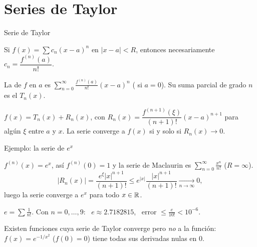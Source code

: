 \documentclass[10pt,aspectratio=169]{beamer}
\begin{document}
\section{Series de Taylor}

\begin{frame}{Serie de Taylor}
  \begin{teorema}
    Si $f(x)=\sum c_n(x-a)^n$ en $|x-a|<R$, entonces necesariamente $c_n=\dfrac{f^{(n)}(a)}{n!}$.
  \end{teorema}
  \begin{definicion}
    La  de $f$ en $a$ es $\displaystyle\sum_{n=0}^\infty\frac{f^{(n)}(a)}{n!}(x-a)^n$
    ( si $a=0$). Su suma parcial de grado $n$ es el  $T_n(x)$.
  \end{definicion}
  \begin{teorema}
    $f(x)=T_n(x)+R_n(x)$, con $R_n(x)=\dfrac{f^{(n+1)}(\xi)}{(n+1)!}(x-a)^{n+1}$ para algún $\xi$ entre $a$ y $x$.
    La serie converge a $f(x)$ si y solo si $R_n(x)\to0$.
  \end{teorema}
\end{frame}

\begin{frame}{Ejemplo: la serie de $e^x$}
  \begin{ejemplo}[$e^x$]
    $f^{(n)}(x)=e^x$, así $f^{(n)}(0)=1$ y la serie de Maclaurin es $\displaystyle\sum_{n=0}^\infty\frac{x^n}{n!}$ ($R=\infty$).
    \[ |R_n(x)|=\frac{e^{\xi}|x|^{n+1}}{(n+1)!}\le e^{|x|}\frac{|x|^{n+1}}{(n+1)!}\xrightarrow[n\to\infty]{}0, \]
    luego la serie converge a $e^x$ para todo $x\in\mathbb{R}$.
  \end{ejemplo}
  \begin{ejemplo}[cálculo de $e$]
    $e=\sum\frac1{n!}$. Con $n=0,\dots,9$: \ $e\approx2.7182815$, \ error $\le\frac{e}{10!}<10^{-6}$.
  \end{ejemplo}
  \begin{observacion}
    Existen funciones cuya serie de Taylor converge pero \emph{no} a la función: $f(x)=e^{-1/x^2}$ ($f(0)=0$) tiene
    todas sus derivadas nulas en $0$.
  \end{observacion}
\end{frame}
\end{document}
